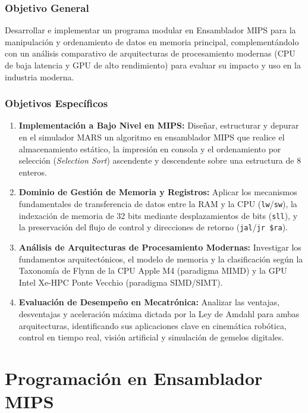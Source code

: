 \documentclass[12pt,a4paper]{article}
\begin{document}
\subsubsection{Objetivo General}
Desarrollar e implementar un programa modular en Ensamblador MIPS para la manipulación y ordenamiento de datos en memoria principal, complementándolo con un análisis comparativo de arquitecturas de procesamiento modernas (CPU de baja latencia y GPU de alto rendimiento) para evaluar su impacto y uso en la industria moderna.

\subsubsection{Objetivos Específicos}
\begin{enumerate}[leftmargin=*]
    \item \textbf{Implementación a Bajo Nivel en MIPS:} Diseñar, estructurar y depurar en el simulador MARS un algoritmo en ensamblador MIPS que realice el almacenamiento estático, la impresión en consola y el ordenamiento por selección (\textit{Selection Sort}) ascendente y descendente sobre una estructura de $8$ enteros.
    
    \item \textbf{Dominio de Gestión de Memoria y Registros:} Aplicar los mecanismos fundamentales de transferencia de datos entre la RAM y la CPU (\texttt{lw}/\texttt{sw}), la indexación de memoria de 32 bits mediante desplazamientos de bits (\texttt{sll}), y la preservación del flujo de control y direcciones de retorno (\texttt{jal}/\texttt{jr \$ra}).
    
    \item \textbf{Análisis de Arquitecturas de Procesamiento Modernas:} Investigar los fundamentos arquitectónicos, el modelo de memoria y la clasificación según la Taxonomía de Flynn de la CPU Apple M4 (paradigma MIMD) y la GPU Intel Xe-HPC Ponte Vecchio (paradigma SIMD/SIMT).
    
    \item \textbf{Evaluación de Desempeño en Mecatrónica:} Analizar las ventajas, desventajas y aceleración máxima dictada por la Ley de Amdahl para ambas arquitecturas, identificando sus aplicaciones clave en cinemática robótica, control en tiempo real, visión artificial y simulación de gemelos digitales.
\end{enumerate}

\newpage
\section{Programación en Ensamblador MIPS}
\end{document}
